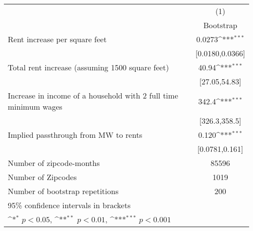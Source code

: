{
\def\sym#1{\ifmmode^{#1}\else\(^{#1}\)\fi}
\begin{tabular}{l*{1}{c}}
\hline\hline
            &\multicolumn{1}{c}{(1)}        \\
            &\multicolumn{1}{c}{Bootstrap}  \\
\hline
Rent increase per square feet&                0.0273\sym{***}\\
            &       [0.0180,0.0366]         \\
[1em]
Total rent increase (assuming 1500 square feet)&                 40.94\sym{***}\\
            &         [27.05,54.83]         \\
[1em]
Increase in income of a household with 2 full time minimum wages&                 342.4\sym{***}\\
            &         [326.3,358.5]         \\
[1em]
Implied passthrough from MW to rents&                 0.120\sym{***}\\
            &        [0.0781,0.161]         \\
\hline
Number of zipcode-months&                 85596         \\
Number of Zipcodes&                  1019         \\
Number of bootstrap repetitions&                   200         \\
\hline\hline
\multicolumn{2}{l}{\footnotesize 95\% confidence intervals in brackets}\\
\multicolumn{2}{l}{\footnotesize \sym{*} \(p<0.05\), \sym{**} \(p<0.01\), \sym{***} \(p<0.001\)}\\
\end{tabular}
}

